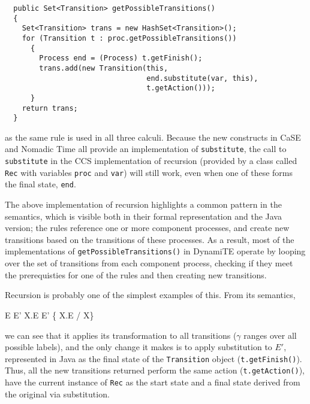 \begin{verbatim}
  public Set<Transition> getPossibleTransitions()
  {
    Set<Transition> trans = new HashSet<Transition>();
    for (Transition t : proc.getPossibleTransitions())
      {
        Process end = (Process) t.getFinish();
        trans.add(new Transition(this,
                                 end.substitute(var, this),
                                 t.getAction()));
      }
    return trans;
  }
\end{verbatim}

\noindent as the same rule is used in all three calculi.  Because the
new constructs in CaSE and Nomadic Time all provide an implementation
of \texttt{substitute}, the call to \texttt{substitute} in the CCS
implementation of recursion (provided by a class called \texttt{Rec}
with variables \texttt{proc} and \texttt{var}) will still work, even
when one of these forms the final state, \texttt{end}.

The above implementation of recursion highlights a common pattern in
the semantics, which is visible both in their formal representation
and the Java version; the rules reference one or more component
processes, and create new transitions based on the transitions of
these processes.  As a result, most of the implementations of
\texttt{getPossibleTransitions()} in DynamiTE operate by looping over
the set of transitions from each component process, checking if they
meet the prerequisties for one of the rules and then creating new
transitions.

Recursion is probably one of the simplest examples of this.  From its
semantics,
\begin{center}
      {E \derives{\gamma} E'}
      {\mu X.E \derives{\gamma} E' \{ \mu X.E / X\}}
      {}
\end{center}
\noindent we can see that it applies its transformation to all
transitions ($\gamma$ ranges over all possible labels), and the only
change it makes is to apply substitution to $E'$, represented in Java
as the final state of the \texttt{Transition} object
(\texttt{t.getFinish()}).  Thus, all the new transitions returned
perform the same action (\texttt{t.getAction()}), have the current
instance of \texttt{Rec} as the start state and a final state derived
from the original via substitution.

